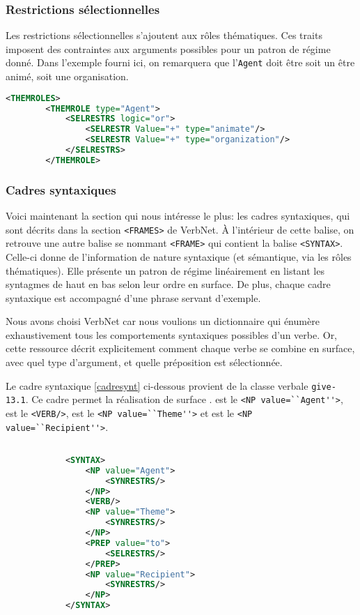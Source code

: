 \subsubsection{Restrictions sélectionnelles}
Les restrictions sélectionnelles s'ajoutent aux rôles thématiques. Ces traits imposent des contraintes aux arguments possibles pour un patron de régime donné. Dans l'exemple fourni ici, on remarquera que l'\texttt{Agent} doit être soit un être animé, soit une organisation.

\begin{lstlisting}[language=Xml, caption = Les restrictions sélectionnelles]
    <THEMROLES>
        <THEMROLE type="Agent">
            <SELRESTRS logic="or">
                <SELRESTR Value="+" type="animate"/>
                <SELRESTR Value="+" type="organization"/>
            </SELRESTRS>
        </THEMROLE>
\end{lstlisting}

\subsubsection{Cadres syntaxiques}

Voici maintenant la section qui nous intéresse le plus: les cadres syntaxiques, qui sont décrits dans la section \lstinline{<FRAMES>} de VerbNet. À l'intérieur de cette balise, on retrouve une autre balise se nommant \lstinline{<FRAME>} qui contient la balise \lstinline{<SYNTAX>}. Celle-ci donne de l'information de nature syntaxique (et sémantique, via les rôles thématiques). Elle présente un patron de régime linéairement en listant les syntagmes de haut en bas selon leur ordre en surface. De plus, chaque cadre syntaxique est accompagné d'une phrase servant d'exemple.

Nous avons choisi VerbNet car nous voulions un dictionnaire qui énumère exhaustivement tous les comportements syntaxiques possibles d'un verbe. Or, cette ressource décrit explicitement comment chaque verbe se combine en surface, avec quel type d'argument, et quelle préposition est sélectionnée.

Le cadre syntaxique \ref{cadresynt} ci-dessous provient de la classe verbale \texttt{give-13.1}. Ce cadre permet la réalisation de surface .  est le \lstinline{<NP value=``Agent''>},  est le \lstinline{<VERB/>},  est le \lstinline{<NP value=``Theme''>} et  est le \lstinline{<NP value=``Recipient''>}.

\begin{lstlisting}[language=Xml, caption = cadres syntaxiques, label=cadresynt]

            <SYNTAX>
                <NP value="Agent">
                    <SYNRESTRS/>
                </NP>
                <VERB/>
                <NP value="Theme">
                    <SYNRESTRS/>
                </NP>
                <PREP value="to">
                    <SELRESTRS/>
                </PREP>
                <NP value="Recipient">
                    <SYNRESTRS/>
                </NP>
            </SYNTAX>
\end{lstlisting}

